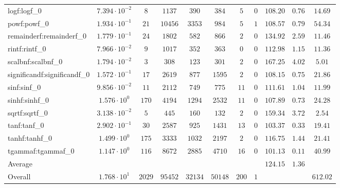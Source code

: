 \begin{tabular}{|l|c|c|c|c|c|c|c|c|c|c|}
logf:logf\_0                 & $ 7.394 \cdot 10^{-2} $ & $ 8      $ & $ 1137  $ & $ 390   $ & $ 384   $ & $ 5   $ & $ 0 $ & $ 108.20      $ & $ 0.76    $ & $ 14.69   $ \\
powf:powf\_0                 & $ 1.934 \cdot 10^{-1} $ & $ 21     $ & $ 10456 $ & $ 3353  $ & $ 984   $ & $ 5   $ & $ 1 $ & $ 108.57      $ & $ 0.79    $ & $ 54.34   $ \\
remainderf:remainderf\_0     & $ 1.779 \cdot 10^{-1} $ & $ 24     $ & $ 1802  $ & $ 582   $ & $ 866   $ & $ 2   $ & $ 0 $ & $ 134.92      $ & $ 2.59    $ & $ 11.46   $ \\
rintf:rintf\_0               & $ 7.966 \cdot 10^{-2} $ & $ 9      $ & $ 1017  $ & $ 352   $ & $ 363   $ & $ 0   $ & $ 0 $ & $ 112.98      $ & $ 1.15    $ & $ 11.36   $ \\
scalbnf:scalbnf\_0           & $ 1.794 \cdot 10^{-2} $ & $ 3      $ & $ 308   $ & $ 123   $ & $ 301   $ & $ 2   $ & $ 0 $ & $ 167.25      $ & $ 4.02    $ & $ 5.01    $ \\
significandf:significandf\_0 & $ 1.572 \cdot 10^{-1} $ & $ 17     $ & $ 2619  $ & $ 877   $ & $ 1595  $ & $ 2   $ & $ 0 $ & $ 108.15      $ & $ 0.75    $ & $ 21.86   $ \\
sinf:sinf\_0                 & $ 9.856 \cdot 10^{-2} $ & $ 11     $ & $ 2112  $ & $ 749   $ & $ 775   $ & $ 11  $ & $ 0 $ & $ 111.61      $ & $ 1.04    $ & $ 11.99   $ \\
sinhf:sinhf\_0               & $ 1.576 \cdot 10^{0}  $ & $ 170    $ & $ 4194  $ & $ 1294  $ & $ 2532  $ & $ 11  $ & $ 0 $ & $ 107.89      $ & $ 0.73    $ & $ 24.28   $ \\
sqrtf:sqrtf\_0               & $ 3.138 \cdot 10^{-2} $ & $ 5      $ & $ 445   $ & $ 160   $ & $ 132   $ & $ 2   $ & $ 0 $ & $ 159.34      $ & $ 3.72    $ & $ 2.54    $ \\
tanf:tanf\_0                 & $ 2.902 \cdot 10^{-1} $ & $ 30     $ & $ 2587  $ & $ 925   $ & $ 1431  $ & $ 13  $ & $ 0 $ & $ 103.37      $ & $ 0.33    $ & $ 19.41   $ \\
tanhf:tanhf\_0               & $ 1.499 \cdot 10^{0}  $ & $ 175    $ & $ 3333  $ & $ 1032  $ & $ 2197  $ & $ 2   $ & $ 0 $ & $ 116.75      $ & $ 1.44    $ & $ 21.41   $ \\
tgammaf:tgammaf\_0           & $ 1.147 \cdot 10^{0}  $ & $ 116    $ & $ 8672  $ & $ 2885  $ & $ 4710  $ & $ 16  $ & $ 0 $ & $ 101.13      $ & $ 0.11    $ & $ 40.99   $ \\
\hline
Average                      & $                     $ & $        $ & $       $ & $       $ & $       $ & $     $ & $   $ & $ 124.15      $ & $ 1.36    $ & $         $ \\
\hline
Overall                      & $ 1.768 \cdot 10^{1}  $ & $ 2029   $ & $ 95452 $ & $ 32134 $ & $ 50148 $ & $ 200 $ & $ 1 $ & $             $ & $         $ & $ 612.02  $ \\
\hline
\end{tabular}
